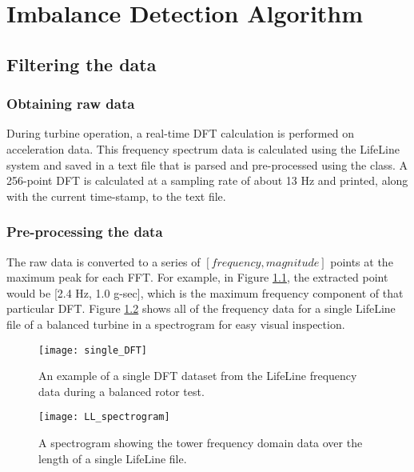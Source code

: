 \chapter{Imbalance Detection Algorithm} %

\label{ch_detection_algorithm}

\section{Filtering the data}
\subsection{Obtaining raw data}
During turbine operation, a real-time DFT calculation is performed on acceleration data.  This frequency spectrum data is calculated using the LifeLine system and saved in a text file that is parsed and pre-processed using the  class.  A 256-point DFT is calculated at a sampling rate of about 13 Hz and printed, along with the current time-stamp, to the text file.

\subsection{Pre-processing the data}

The raw data is converted to a series of $[frequency, magnitude]$ points at the maximum peak for each FFT.  For example, in Figure \ref{fig:single_DFT}, the extracted point would be [2.4 Hz, 1.0 g-sec], which is the maximum frequency component of that particular DFT. Figure \ref{fig:LL_spectrogram} shows all of the frequency data for a single LifeLine file of a balanced turbine in a spectrogram for easy visual inspection.

\begin{figure}
	\centering
	\texttt{[image: single\_DFT]}
	\decoRule
	\caption{An example of a single DFT dataset from the LifeLine frequency data during a balanced rotor test.}
	\label{fig:single_DFT}
\end{figure}

\begin{figure}
	\centering
	\texttt{[image: LL\_spectrogram]}
	\decoRule
	\caption{A spectrogram showing the tower frequency domain data over the length of a single LifeLine file.}
	\label{fig:LL_spectrogram}
\end{figure}

